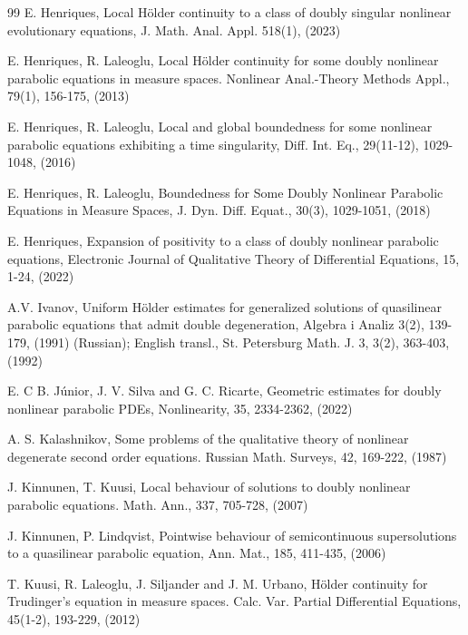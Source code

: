 \documentclass[a4paper,11pt,fullpage]{article}
\numberwithin{equation}{section}
\begin{document}
\begin{thebibliography}{99}
E. Henriques, Local H\"older continuity to a class of doubly singular nonlinear evolutionary equations,
J. Math. Anal. Appl. {518}(1), (2023)

E. Henriques, R.  Laleoglu, Local H\"{o}lder  continuity for some doubly nonlinear parabolic equations in measure spaces.
Nonlinear Anal.-Theory Methods Appl., {79}(1), 156-175, (2013)

{E. Henriques, R. Laleoglu,}  Local and global boundedness for
some nonlinear parabolic equations exhibiting a time singularity,
Diff. Int. Eq., {29}(11-12), 1029-1048, (2016)

{E. Henriques, R. Laleoglu,}  Boundedness for Some Doubly
Nonlinear Parabolic Equations in Measure Spaces, J. Dyn. Diff.
Equat., {30}(3), 1029-1051, (2018)

E. Henriques, Expansion of positivity to a class of doubly nonlinear parabolic equations, Electronic Journal of Qualitative Theory of Differential Equations, 15, 1-24, (2022)  %


{A.V. Ivanov,} Uniform H\"older estimates for generalized
solutions of quasilinear parabolic equations
that admit double degeneration, Algebra i Analiz {3}(2), 139-179, (1991) (Russian); English transl., St. Petersburg Math. J.
3, {3}(2), 363-403, (1992)

E. C B. J\'unior, J. V. Silva and G. C. Ricarte, Geometric estimates for doubly nonlinear parabolic PDEs, Nonlinearity, {35}, 2334-2362,  (2022) 

{A. S. Kalashnikov,} Some problems of the qualitative theory of
nonlinear degenerate second order equations. Russian Math. Surveys, {42}, 169-222, (1987)

{J. Kinnunen, T. Kuusi,} Local behaviour of solutions to doubly
nonlinear parabolic equations.  Math. Ann., {337}, 705-728, (2007)

 J. Kinnunen, P. Lindqvist, Pointwise behaviour of semicontinuous supersolutions to a quasilinear parabolic equation, Ann. Mat., 185, 411-435, (2006)



T. Kuusi, R. Laleoglu, J. Siljander and J. M. Urbano, H\"{o}lder continuity for Trudinger's equation in measure spaces.
 Calc. Var. Partial Differential Equations, {45}(1-2), 193-229, (2012)


\end{thebibliography}
\end{document}
